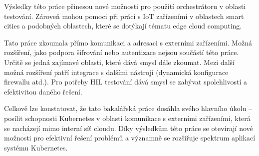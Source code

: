\bigskip

Výsledky této práce přinesou nové možnosti pro použití orchestrátoru v oblasti testování. Zároveň mohou pomoci při práci s IoT zařízeními v oblastech smart cities a podobných oblastech, které se dotýkají tématu edge cloud computing.

Tato práce zkoumala přímo komunikaci a adresaci s externími zařízeními. Možná rozšíření, jako podpora šifrování nebo autentizace nejsou součástí této práce. Určitě se jedná zajímavé oblasti, které dává smysl dále zkoumat. Mezi další možná rozšíření patří integrace s dalšími nástroji (dynamická konfigurace firewallu atd.). Pro potřeby HIL testování dává smysl se zabývat spolehlivostí a efektivitou daného řešení.

Celkově lze konstatovat, že tato bakalářská práce dosáhla svého hlavního úkolu -- posílit schopnosti Kubernetes v oblasti komunikace s externími zařízeními, která se nacházejí mimo interní síť cloudu. Díky výsledkům této práce se otevírají nové možnosti pro efektivní řešení problémů a významně se rozšiřuje spektrum aplikací systému Kubernetes.
